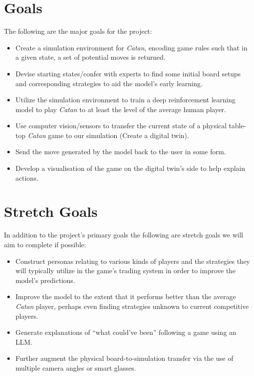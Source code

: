 \documentclass{article}
\begin{document}
\section{Goals}\label{sec:goals}
The following are the major goals for the project:
\begin{itemize}
    \item Create a simulation environment for \emph{Catan}, encoding game rules such that in a given state, a set of potential moves is returned.
    \item Devise starting states/confer with experts to find some initial board setups and corresponding strategies to aid the model’s early learning.
    \item Utilize the simulation environment to train a deep reinforcement learning model to play \emph{Catan} to at least the level of the average human player.
    \item Use computer vision/sensors to transfer the current state of a physical table-top \emph{Catan} game to our simulation (Create a digital twin).
    \item Send the move generated by the model back to the user in some form.
    \item Develop a visualisation of the game on the digital twin’s side to help explain actions.
\end{itemize}

\section{Stretch Goals}\label{sec:stretch-goals}
In addition to the project’s primary goals the following are stretch goals we will aim to complete if possible:
\begin{itemize}
    \item Construct personas relating to various kinds of players and the strategies they will typically utilize in the game’s trading system in order to improve the model’s predictions.
    \item Improve the model to the extent that it performs better than the average \emph{Catan} player, perhaps even finding strategies unknown to current competitive players.
    \item Generate explanations of “what could’ve been” following a game using an LLM\@.
    \item Further augment the physical board-to-simulation transfer via the use of multiple camera angles or smart glasses.
\end{itemize}
\end{document}
